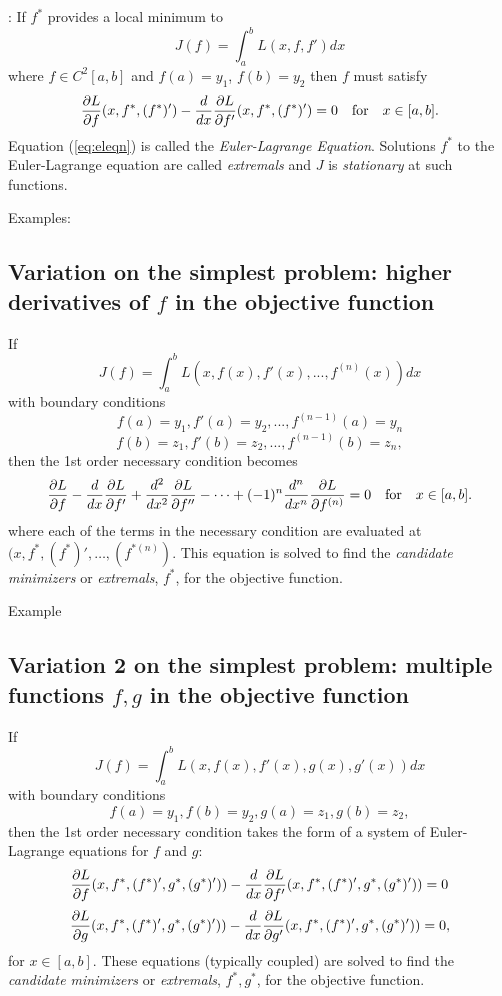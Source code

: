 : If $f^*$ provides a local minimum to $$J(f) = \int_a^b L(x, f, f') dx$$ where $f\in C^2[a,b]$ and $f(a)=y_1$, $f(b) = y_2$ then $f$ must satisfy 
\begin{equation}\label{eq:eleqn}
\frac{\partial L}{\partial f}(x, f^*, (f^*)') - \frac{d}{dx}\frac{\partial L}{\partial f'}(x, f^*, (f^*)')= 0 \quad {\rm for} \quad x \in [a,b].
\end{equation}
Equation (\ref{eq:eleqn}) is called the {\it Euler-Lagrange Equation}. Solutions $f^*$ to the Euler-Lagrange equation are called {\it extremals} and $J$ is {\it stationary} at such functions.

\noindent Examples:

\newpage

\subsection{Variation on the simplest problem:  higher derivatives of $f$ in the objective function} If
$$J(f) = \int_a^b L(x, f(x), f'(x), ..., f^{(n)}(x)) dx$$ with boundary conditions
$$f(a) = y_1, f'(a) = y_2, ..., f^{(n-1)}(a) = y_n$$
$$f(b) = z_1, f'(b) = z_2, ..., f^{(n-1)}(b) = z_n,$$
then the 1st order necessary condition becomes
$$\frac{\partial L}{\partial f} - \frac{d}{dx}\frac{\partial L}{\partial f'} + \frac{d^2}{dx^2}\frac{\partial L}{\partial f''} - \cdots + (-1)^n\frac{d^n}{dx^n}\frac{\partial L}{\partial f^{(n)}} = 0 \quad {\rm for} \quad x \in [a,b].$$
where each of the terms in the necessary condition are evaluated at $(x, f^*, (f^*)',\ldots, (f^{*(n)})$. This equation is solved to find the {\it candidate minimizers} or {\it extremals}, $f^*$, for the objective function.
\medskip

\noindent Example
\newpage

\subsection{Variation 2 on the simplest problem:  multiple functions $f, g$ in the objective function} If
$$J(f) = \int_a^b L(x, f(x), f'(x), g(x), g'(x)) dx$$ with boundary conditions
$$f(a) = y_1, f(b) = y_2, g(a) = z_1, g(b) = z_2,$$
then the 1st order necessary condition takes the form of a system of Euler-Lagrange equations for $f$ and $g$:
$$
\frac{\partial L}{\partial f}(x, f^*, (f^*)',g^*, (g^*)')) - \frac{d}{dx}\frac{\partial L}{\partial f'}(x, f^*, (f^*)',g^*, (g^*)'))= 0$$
$$\frac{\partial L}{\partial g}(x, f^*, (f^*)',g^*, (g^*)')) - \frac{d}{dx}\frac{\partial L}{\partial g'}(x, f^*, (f^*)',g^*, (g^*)'))= 0,$$
 for $ x \in [a,b]$.
These equations (typically coupled) are solved to find the {\it candidate minimizers} or {\it extremals}, $f^*, g^*$, for the objective function.


